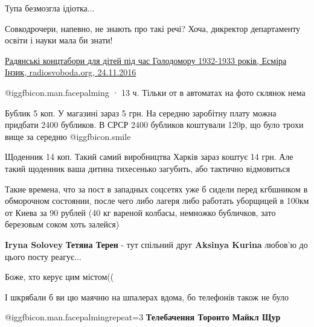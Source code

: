 \begin{itemize}
Тупа безмозгла ідіотка...


Совкодрочери, напевно, не знають про такі речі? Хоча, дикректор департаменту
освіти і науки мала би знати! 

\href{https://www.radiosvoboda.org/a/28137445.html}{%
Радянські концтабори для дітей під час Голодомору 1932-1933 років, Есміра Інзик, radiosvoboda.org, 24.11.2016%
}

 @igg{fbicon.man.facepalming} 
 · 13 ч.
Тільки от в автоматах на фото склянок нема


Бублик 5 коп. У магазині зараз 5 грн. На середню заробітну плату можна придбати
2400 бубликов. В СРСР 2400 бубликов коштували 120р, що було трохи вище за
середню  @igg{fbicon.smile} 

Щоденник 14 коп. Такий самий виробництва Харків зараз коштує 14 грн. Але такий
щоденник ваша дитина тихесенько загубить, або тактично відмовиться


Такие времена, что за пост в западных соцсетях уже б сидели перед кгбшником в
обморочном состоянии, после чего либо лагеря либо работать уборщицей в 100км от
Киева за 90 рублей (40 кг вареной колбасы, немножко бубличков, зато березовым
соком хоть залейся)

\textbf{Iryna Solovey} \textbf{Тетяна Терен} - тут спільний друг \textbf{Aksinya Kurina} любов'ю до цього посту реагує...


Боже, хто керує цим містом((

І шкрябали б ви цю маячню на шпалерах вдома, бо телефонів також не було

 @igg{fbicon.man.facepalming}{repeat=3} 
\textbf{Телебачення Торонто}
\textbf{Майкл Щур}


\end{itemize} %
